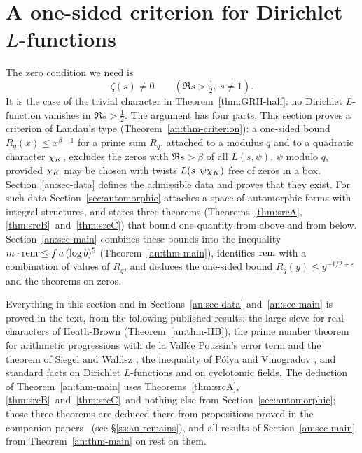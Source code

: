 \documentclass[10pt]{amsart}
\theoremstyle{definition}
\theoremstyle{remark}
\newcommand{\anThmA}{\ref{thm:srcA}}\newcommand{\anThmB}{\ref{thm:srcB}}\newcommand{\anThmC}{\ref{thm:srcC}}
\begin{document}
\section{A one-sided criterion for Dirichlet \texorpdfstring{$L$}{L}-functions}\label{an:sec-criterion}
The zero condition we need is
\begin{equation}\label{eq:dirichlet-input}
 \zeta(s)\ne0\qquad (\Re s>\tfrac12,\ s\ne1).
\end{equation}
It is the case of the trivial character in Theorem~\ref{thm:GRH-half}: no
Dirichlet $L$-function vanishes in $\Re s>\frac12$. The argument has four
parts. This section proves a criterion of Landau's type
(Theorem~\ref{an:thm-criterion}): a one-sided bound $R_q(x)\le x^{\beta-1}$
for a prime sum $R_q$, attached to a modulus $q$ and to a quadratic character
$\chi_K$, excludes the zeros with $\Re s>\beta$ of all $L(s,\psi)$,
$\psi$ modulo $q$, provided $\chi_K$ may be chosen with twists
$L(s,\psi\chi_K)$ free of zeros in a box. Section~\ref{an:sec-data} defines
the admissible data and proves that they exist. For such data
Section~\ref{sec:automorphic} attaches a space of automorphic forms with
integral structures, and states three theorems
(Theorems~\anThmA, \anThmB\ and~\anThmC) that bound one quantity from above
and from below. Section~\ref{an:sec-main} combines these bounds into
the inequality $m\cdot\operatorname{rem}\le f\,a\,(\log b)^5$ (Theorem~\ref{an:thm-main}),
identifies $\operatorname{rem}$ with a combination of values of $R_q$, and deduces the
one-sided bound $R_{q}(y)\le y^{-1/2+\varepsilon}$ and the theorems on zeros.

Everything in this section and in Sections~\ref{an:sec-data}
and~\ref{an:sec-main} is proved in the text, from the following published
results: the large sieve for real characters of Heath-Brown
(Theorem~\ref{an:thm-HB}), the prime number theorem for arithmetic
progressions with de la Vall\'ee Poussin's error term and the theorem of
Siegel and Walfisz \cite[Chapters~20 and~22]{Davenport}, the inequality of
P\'olya and Vinogradov \cite[Chapter~23]{Davenport}, and standard facts on
Dirichlet $L$-functions and on cyclotomic fields. The deduction of
Theorem~\ref{an:thm-main} uses Theorems~\anThmA, \anThmB\ and~\anThmC\ and
nothing else from Section~\ref{sec:automorphic}; those three theorems are
deduced there from propositions proved in the companion papers~\cite{P49,P50,P51,P52,P53,P54,P55,P56} (see \S\ref{ss:au-remains}), and all results of
Section~\ref{an:sec-main} from Theorem~\ref{an:thm-main} on rest on them.
\end{document}
